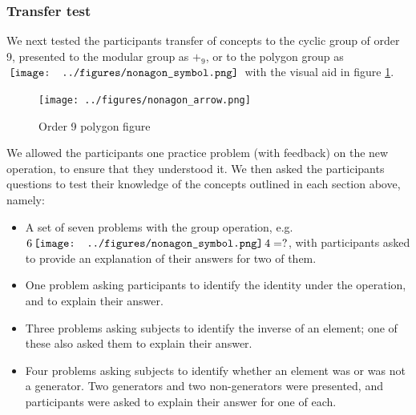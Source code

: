 \documentclass[man,10pt]{apa6}
\newcommand{\nonagon}{\,\vcenter{\hbox{\texttt{[image: ../figures/nonagon\_symbol.png]}}}\,}
\begin{document}
\subsubsection{Transfer test}
We next tested the participants transfer of concepts to the cyclic group of order 9, presented to the modular group as $+_9$, or to the polygon group as $\nonagon$ with the visual aid in figure \ref{nonagonex}. 
\begin{figure} \centering \texttt{[image: ../figures/nonagon\_arrow.png]} \caption{Order 9 polygon figure} \label{nonagonex} \end{figure} \noindent
We allowed the participants one practice problem (with feedback) on the new operation, to ensure that they understood it. We then asked the participants questions to test their knowledge of the concepts outlined in each section above, namely:
\begin{itemize} 
\item A set of seven problems with the group operation, e.g. $6 \nonagon 4 = ?$, with participants asked to provide an explanation of their answers for two of them. 
\item One problem asking participants to identify the identity under the operation, and to explain their answer.
\item Three problems asking subjects to identify the inverse of an element; one of these also asked them to explain their answer.
\item Four problems asking subjects to identify whether an element was or was not a generator. Two generators and two non-generators were presented, and participants were asked to explain their answer for one of each.
\end{itemize}
\end{document}
